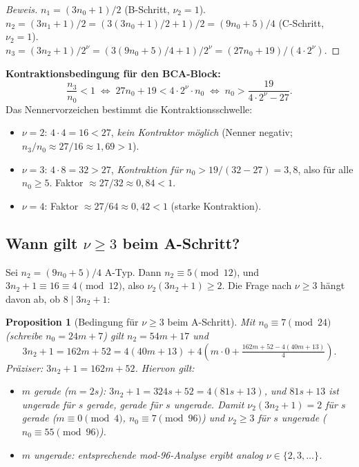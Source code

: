 \documentclass[12pt,a4paper]{article}
\newtheorem{proposition}[definition]{Proposition}
\newenvironment{beweis}{\begin{proof}[Beweis]}{\end{proof}}
\newcommand{\vii}{\nu_2}
\begin{document}
\begin{beweis}
$n_1 = (3n_0+1)/2$ (B-Schritt, $\vii=1$).
$n_2 = (3n_1+1)/2 = (3(3n_0+1)/2+1)/2 = (9n_0+5)/4$ (C-Schritt, $\vii=1$).
$n_3 = (3n_2+1)/2^\nu = (3(9n_0+5)/4+1)/2^\nu = (27n_0+19)/(4\cdot 2^\nu)$.
\end{beweis}

\begin{tcolorbox}[ergebnis]
\textbf{Kontraktionsbedingung für den B\textbullet C\textbullet A-Block:}
\[
  \frac{n_3}{n_0} < 1
  \;\Longleftrightarrow\;
  27n_0 + 19 < 4 \cdot 2^\nu \cdot n_0
  \;\Longleftrightarrow\;
  n_0 > \frac{19}{4 \cdot 2^\nu - 27}.
\]
Das Nennervorzeichen bestimmt die Kontraktionsschwelle:
\begin{itemize}
  \item $\nu = 2$: $4 \cdot 4 = 16 < 27$, \emph{kein Kontraktor möglich}
    (Nenner negativ; $n_3/n_0 \approx 27/16 \approx 1{,}69 > 1$).
  \item $\nu = 3$: $4 \cdot 8 = 32 > 27$, \emph{Kontraktion für} $n_0 > 19/(32-27) = 3{,}8$,
    also für alle $n_0 \geq 5$. Faktor $\approx 27/32 \approx 0{,}84 < 1$.
  \item $\nu = 4$: Faktor $\approx 27/64 \approx 0{,}42 < 1$ (starke Kontraktion).
\end{itemize}
\end{tcolorbox}

\subsection{Wann gilt $\nu \geq 3$ beim A-Schritt?}

Sei $n_2 = (9n_0+5)/4$ A-Typ. Dann $n_2 \equiv 5 \pmod{12}$, und
$3n_2+1 \equiv 16 \equiv 4 \pmod{12}$, also $\vii(3n_2+1) \geq 2$.
Die Frage nach $\nu \geq 3$ hängt davon ab, ob $8 \mid 3n_2+1$:

\begin{proposition}[Bedingung für $\nu \geq 3$ beim A-Schritt]
\label{prop:nu3}
Mit $n_0 \equiv 7 \pmod{24}$ (schreibe $n_0 = 24m+7$) gilt
$n_2 = 54m + 17$ und
\[
  3n_2 + 1 = 162m + 52 = 4(40m + 13) + 4(m\cdot 0 + \tfrac{162m+52-4(40m+13)}{4}).
\]
Präziser: $3n_2 + 1 = 162m + 52$. Hiervon gilt:
\begin{itemize}
  \item $m$ gerade ($m = 2s$): $3n_2+1 = 324s+52 = 4(81s+13)$,
    und $81s+13$ ist ungerade für $s$ gerade, gerade für $s$ ungerade.
    Damit $\vii(3n_2+1) = 2$ für $s$ gerade ($m \equiv 0 \pmod 4$, $n_0 \equiv 7 \pmod{96}$)
    und $\vii \geq 3$ für $s$ ungerade ($n_0 \equiv 55 \pmod{96}$).
  \item $m$ ungerade: entsprechende mod-96-Analyse ergibt analog $\nu \in \{2, 3, \ldots\}$.
\end{itemize}
\end{proposition}
\end{document}
